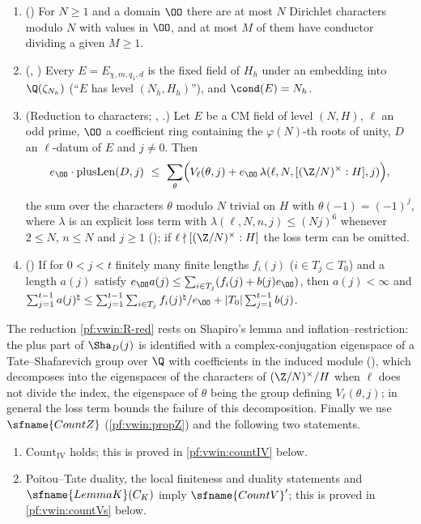 \begin{enumerate}[label=(R\arabic*)]
\item\label{pf:vwin:R-card} () For $N\ge1$ and a domain $\OO$ there are at most $N$ Dirichlet
characters modulo $N$ with values in $\OO$, and at most $M$ of them have conductor dividing a given $M\ge1$.
\item\label{pf:vwin:R-level} (, ) Every
$E=E_{\chi,m,q_1,d}$ is the fixed field of $H_h$ under an embedding into $\Q(\zeta_{N_h})$ (``$E$ has level $(N_h,H_h)$''), and
$\cond(E)=N_h$.
\item\label{pf:vwin:R-red} (Reduction to characters; ,
.) Let $E$ be a CM field of level $(N,H)$, $\ell$ an odd prime, $\OO$ a coefficient ring
containing the $\varphi(N)$-th roots of unity, $D$ an $\ell$-datum of $E$ and $j\ne0$. Then
\[
 e_\OO\cdot\vwinplus(D,j)\ \le\ \sum_{\theta}\Bigl(V_\ell(\theta,j)+e_\OO\,\lambda(\ell,N,[(\Z/N)^\times:H],j)\Bigr),
\]
the sum over the characters $\theta$ modulo $N$ trivial on $H$ with $\theta(-1)=(-1)^j$, where $\lambda$ is an explicit loss
term with $\lambda(\ell,N,n,j)\le(Nj)^6$ whenever $2\le N$, $n\le N$ and $j\ge1$ (); if
$\ell\nmid[(\Z/N)^\times:H]$ the loss term can be omitted.
\item\label{pf:vwin:R-sum} () If for $0<j<t$ finitely many finite lengths $f_i(j)$ ($i\in T_j\subset
T_0$) and a length $a(j)$ satisfy $e_\OO a(j)\le\sum_{i\in T_j}(f_i(j)+b(j)e_\OO)$, then $a(j)<\infty$ and
$\sum_{j=1}^{t-1}a(j)^\natural\le\sum_{j=1}^{t-1}\sum_{i\in T_j}f_i(j)^\natural/e_\OO+|T_0|\sum_{j=1}^{t-1}b(j)$.
\end{enumerate}
The reduction \ref{pf:vwin:R-red} rests on Shapiro's lemma and inflation--restriction: the plus part of $\Sha_D(j)$ is
identified with a complex-conjugation eigenspace of a Tate--Shafarevich group over $\Q$ with coefficients in the
induced module (), which decomposes into the eigenspaces of the characters of
$(\Z/N)^\times/H$ when $\ell$ does not divide the index, the eigenspace of $\theta$ being the group defining $V_\ell(\theta,j)$; in
general the loss term bounds the failure of this decomposition. Finally we use $\sfname{CountZ}$ (\cref{pf:vwin:propZ}) and the following two statements.
\begin{enumerate}[label=(C\arabic*)]
\item\label{pf:vwin:C-IV} $\mathrm{Count}_{\mathrm{IV}}$ holds; this is proved in \cref{pf:vwin:countIV} below.
\item\label{pf:vwin:C-V} Poitou--Tate duality, the local finiteness and duality statements and $\sfname{LemmaK}(C_K)$ imply
$\sfname{CountV}'$; this is proved in \cref{pf:vwin:countVs} below.
\end{enumerate}

